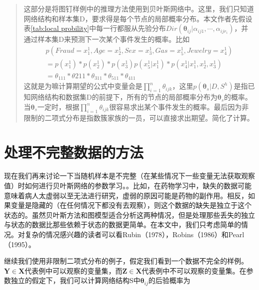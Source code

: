 \documentclass[10pt,a4paper]{article}
\begin{document}
\begin{CJK*}{UTF8}{gkai}
\begin{quotation}
这部分是将图钉样例中的推理方法使用到贝叶斯网络中。这里，我们只知道网络结构和样本集D，要求得是每个节点的局部概率分布。本文作者先假设表\ref{tab:local probility}中每一行都服从先验分布$Dir(\boldsymbol{\theta}_{ij}|\alpha_{ij1},\cdots,\alpha_{ijr_i})$，并通过样本集D来预测下一次某个事件发生的概率。比如
\begin{eqnarray}
p(Fraud=x_1^1,Age=x_2^1,Sex=x_3^1,Gas=x_5^1,Jewelry=x_4^1) \nonumber\\
=p(x_1^1)*p(x_2^1)*p(x_3^1)p(x_5^1|x_1^1)*p(x_4^1|x_1^1,x_2^1,x_3^1) \nonumber\\
=\theta_{111}*\theta{211}*\theta_{311}*\theta_{511}*\theta_{411}
\nonumber
\end{eqnarray}
这就是为嘛计算期望的公式中变量会是$\prod_{i=1}^n\theta_{ijk}$，这里$p(\boldsymbol{\theta}_s|D,S^h)$是指已知网络结构和数据集D的前提下，所有的节点的局部概率分布为$\boldsymbol{\theta}_s$的概率。当$\boldsymbol{\theta}_s$一定时，根据$\prod_{i=1}^n\theta_{ijk}$很容易求出某个事件发生的概率。最后因为非限制的二项式分布是指数簇家族的一员，可以直接求出期望。简化了计算。
\end{quotation}



\section{处理不完整数据的方法}
现在我们再来讨论一下当随机样本是不完整（在某些情况下一些变量无法获取观察值）时如何进行贝叶斯网络的参数学习。。比如，在药物学习中，缺失的数据可能意味着病人太虚弱以至无法进行研究，虚弱的原因可能是药物的副作用。相反，如果变量是隐藏的（在任何情况下都没有去观察），则这个数据的缺失是独立于这个状态的。虽然贝叶斯方法和图模型适合分析这两种情况，但是处理那些丢失的独立与状态的数据比那些依赖于状态的数据更简单。在本文中，我们只考虑简单的情况。对复杂的情况感兴趣的读者可以看Rubin（1978），Robins（1986）和Pearl（1995）。


继续我们使用非限制二项式分布的例子，假定我们看到一个数据不完全的样例。$\boldsymbol{Y} \in \boldsymbol{X}$代表例中可以观察的变量集，而$\boldsymbol{Z} \in \boldsymbol{X}$代表例中不可以观察的变量集。在参数独立的假定下，我们可以计算网络结构S中$\boldsymbol{\theta}_{ij}$的后验概率为


\end{CJK*}
\end{document}

